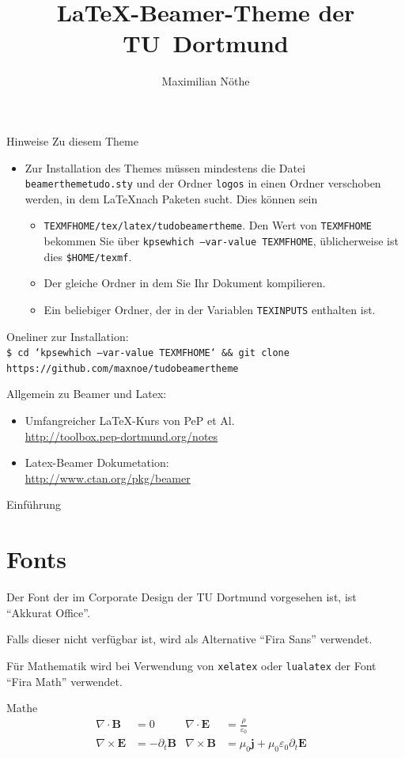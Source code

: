 \documentclass[aspectratio=1610, 9pt]{beamer}
\title{\LaTeX-Beamer-Theme der TU~Dortmund}
\author[M.~Nöthe]{Maximilian Nöthe}
\institute[Kurzform Lehrstuhl]{Names des Lehrstuhls \\  Name der Fakultät}
\begin{document}
\maketitle

\begin{frame}{Hinweise}
  Zu diesem Theme
  \begin{itemize}
    \item Zur Installation des Themes müssen mindestens die Datei \texttt{beamerthemetudo.sty} und der Ordner \texttt{logos} in einen Ordner verschoben werden, in dem \LaTeX nach Paketen sucht.
      Dies können sein
      \begin{itemize}
        \item \texttt{TEXMFHOME/tex/latex/tudobeamertheme}. Den Wert von \texttt{TEXMFHOME} bekommen Sie über \texttt{kpsewhich --var-value TEXMFHOME}, üblicherweise ist dies \texttt{\$HOME/texmf}.
        \item Der gleiche Ordner in dem Sie Ihr Dokument kompilieren.
        \item Ein beliebiger Ordner, der in der Variablen \texttt{TEXINPUTS} enthalten ist.
      \end{itemize}
  \end{itemize}
  
  Oneliner zur Installation:\\
  \texttt{\footnotesize\$ cd `kpsewhich --var-value TEXMFHOME` \&\& git clone https://github.com/maxnoe/tudobeamertheme}

  \medskip
  Allgemein zu Beamer und Latex:
  \begin{itemize}
    \item Umfangreicher \LaTeX-Kurs von PeP et Al. \\
      \url{http://toolbox.pep-dortmund.org/notes}
    \item Latex-Beamer Dokumetation:\\
    \url{http://www.ctan.org/pkg/beamer}
  \end{itemize}
\end{frame}

\begin{frame}{Einführung}
  \tableofcontents
\end{frame}

\section{Fonts}
\begin{frame}
  Der Font der im Corporate Design der TU Dortmund vorgesehen ist,
  ist \enquote{Akkurat Office}.

  Falls dieser nicht verfügbar ist, wird als Alternative \enquote{Fira Sans}
  verwendet.

  Für Mathematik wird bei Verwendung von \texttt{xelatex} oder \texttt{lualatex} der Font \enquote{Fira Math} verwendet.
\end{frame}

\begin{frame}{Mathe}
  \begin{align*}
    \nabla \cdot \symbf{B} &= 0 &
    \nabla \cdot \symbf{E} &= \frac{ρ}{ε_0} \\
    \nabla \times \symbf{E} &= -\partial_t \symbf{B} &
    \nabla \times \symbf{B} &= μ_0 \symbf{j} + μ_0 ε_0 \partial_t \symbf{E} &
  \end{align*}
\end{frame}
\end{document}
